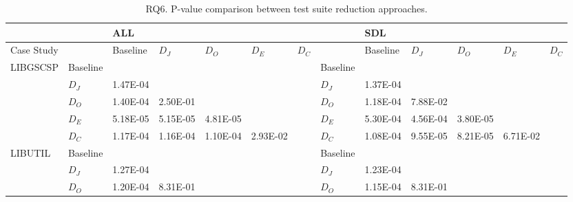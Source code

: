 \begin{table*}
\tiny
\centering
\caption{RQ6. P-value comparison between test suite reduction approaches.}
\label{table:results:pValComparisonTSredPrior} 
\begin{tabular}{|l|l|lllll|l|lllll|}
\hline
           &          & ALL      &                       &                       &          &      &          & SDL      &                       &                       &                       &       \\
\hline           
Case Study &          & Baseline & $D_J$                  & $D_O$                  & $D_E$     & $D_C$ &          & Baseline & $D_J$                  & $D_O$                  & $D_E$                  & $D_C$  \\
\hline
LIBGSCSP   & Baseline &          &                       &                       &          &      & Baseline &          &                       &                       &                       &       \\
           & $D_J$     & 1.47E-04 &                       &                       &          &      & $D_J$     & 1.37E-04 &                       &                       &                       &       \\
           & $D_O$     & 1.40E-04 & 2.50E-01              &                       &          &      & $D_O$     & 1.18E-04 & 7.88E-02              &                       &                       &       \\
           & $D_E$     & 5.18E-05 & 5.15E-05              & 4.81E-05              &          &      & $D_E$     & 5.30E-04 & 4.56E-04              & 3.80E-05              &                       &       \\
           & $D_C$     & 1.17E-04 & 1.16E-04              & 1.10E-04              & 2.93E-02 &      & $D_C$     & 1.08E-04 & 9.55E-05              & 8.21E-05              & 6.71E-02              &       \\
\hline
LIBUTIL    & Baseline &          &                       &                       &          &      & Baseline &          &                       &                       &                       &       \\
           & $D_J$     & 1.27E-04 &                       &                       &          &      & $D_J$     & 1.23E-04 &                       &                       &                       &       \\
           & $D_O$     & 1.20E-04 & 8.31E-01              &                       &          &      & $D_O$     & 1.15E-04 & 8.31E-01              &                       &                       &       \\

\end{tabular}
\end{table*}
